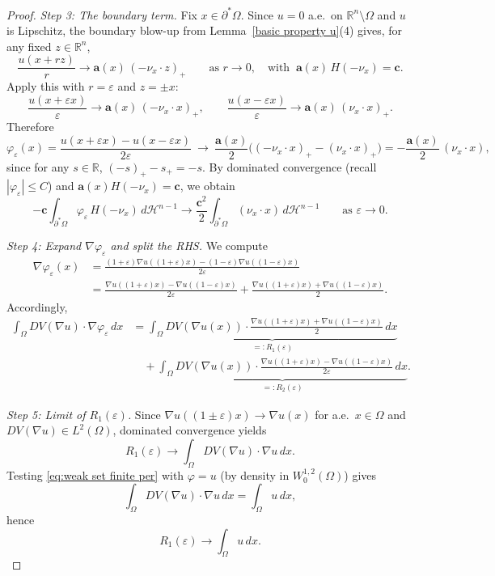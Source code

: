 \documentclass[reqno,11pt]{amsart}
\numberwithin{equation}{section}
\theoremstyle{remark}
\begin{document}
\begin{proof}
\medskip
\noindent\textit{Step 3: The boundary term.}
Fix $x\in\partial^*\Omega$. Since $u=0$ a.e.\ on $\mathbb R^n\setminus\Omega$ and $u$ is Lipschitz, the boundary blow-up
from Lemma~\ref{basic property u}(4) gives, for any fixed $z\in\mathbb R^n$,
\[
\frac{u(x+r z)}{r}\to \mathbf a(x)\,(-\nu_x\cdot z)_+\qquad\text{as }r\to 0,
\quad\text{with }\ \mathbf a(x)\,H(-\nu_x)=\mathbf c.
\]
Apply this with $r=\varepsilon$ and $z=\pm x$:
\[
\frac{u(x+\varepsilon x)}{\varepsilon}\to \mathbf a(x)\,(-\nu_x\cdot x)_+,
\qquad
\frac{u(x-\varepsilon x)}{\varepsilon}\to \mathbf a(x)\,(\nu_x\cdot x)_+.
\]
Therefore
\[
\varphi_\varepsilon(x)
=\frac{u(x+\varepsilon x)-u(x-\varepsilon x)}{2\varepsilon}
\ \longrightarrow\
\frac{\mathbf a(x)}{2}\Big( (-\nu_x\cdot x)_+-(\nu_x\cdot x)_+\Big)
=-\frac{\mathbf a(x)}{2}\,(\nu_x\cdot x),
\]
since for any $s\in\mathbb R$, $(-s)_+-s_+=-s$.
By dominated convergence (recall $|\varphi_\varepsilon|\le C$) and $\mathbf a(x)H(-\nu_x)=\mathbf c$, we obtain
\begin{equation}\label{left 2}
-\mathbf{c} \int_{\partial^*\Omega}  \varphi_\varepsilon \, H(-\nu_x)\, d\mathscr H^{n-1}
\to
\frac{\mathbf{c}^2}{2} \int_{\partial^*\Omega} (\nu_x \cdot x)\, d\mathscr H^{n-1}
\qquad\text{as }\varepsilon\to 0.
\end{equation}

\medskip
\noindent\textit{Step 4: Expand $\nabla\varphi_\varepsilon$ and split the RHS.}
We compute
\begin{align*}
\nabla\varphi_\varepsilon(x)
&= \frac{(1+\varepsilon)\nabla u((1+\varepsilon)x)-(1-\varepsilon)\nabla u((1-\varepsilon)x)}{2\varepsilon}\\
&= \frac{\nabla u((1+\varepsilon)x)-\nabla u((1-\varepsilon)x)}{2\varepsilon}
+ \frac{\nabla u((1+\varepsilon)x)+\nabla u((1-\varepsilon)x)}{2}.
\end{align*}
Accordingly,
\begin{align*}
\int_{\Omega} DV(\nabla u)\cdot \nabla\varphi_\varepsilon \, dx
&=
\underbrace{\int_{\Omega} DV(\nabla u(x))\cdot
\frac{\nabla u((1+\varepsilon)x)+\nabla u((1-\varepsilon)x)}{2}\, dx}_{=:R_1(\varepsilon)}\\
&\quad +\underbrace{\int_{\Omega} DV(\nabla u(x))\cdot
\frac{\nabla u((1+\varepsilon)x)-\nabla u((1-\varepsilon)x)}{2\varepsilon}\, dx}_{=:R_2(\varepsilon)}.
\end{align*}

\medskip
\noindent\textit{Step 5: Limit of $R_1(\varepsilon)$.}
Since $\nabla u((1\pm\varepsilon)x)\to \nabla u(x)$ for a.e.\ $x\in\Omega$ and $DV(\nabla u)\in L^2(\Omega)$, dominated convergence yields
\[
R_1(\varepsilon)\to \int_\Omega DV(\nabla u)\cdot \nabla u\,dx.
\]
Testing \eqref{eq:weak set finite per} with $\varphi=u$ (by density in $W^{1,2}_0(\Omega)$) gives
\[
\int_\Omega DV(\nabla u)\cdot \nabla u\,dx = \int_\Omega u\,dx,
\]
hence
\begin{equation}\label{right 1}
R_1(\varepsilon)\to \int_\Omega u\,dx.
\end{equation}


\end{proof}
\end{document}
